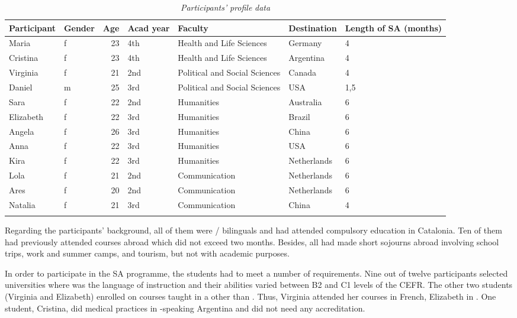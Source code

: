 \documentclass[output=paper]{langsci/langscibook}
\begin{document}
\begin{table}
\small
\begin{tabularx}{\textwidth}{l@{~}l@{~}rp{7mm}Ql@{~}Y}
\lsptoprule
\bfseries Participant & \bfseries Gender & \bfseries Age & \bfseries Acad year & \bfseries Faculty & \bfseries Destination & \bfseries Length of SA (months)\\
\midrule
Maria & f & 23 & 4th & Health and Life Sciences & Germany & 4\\
Cristina & f & 23 & 4th & Health and Life Sciences & Argentina & 4\\
Virginia & f & 21 & 2nd & Political and Social Sciences & Canada & 4\\
Daniel & m & 25 & 3rd & Political and Social Sciences & USA & 1,5\\
Sara & f & 22 & 2nd & Humanities & Australia & 6\\
Elizabeth & f & 22 & 3rd & Humanities & Brazil & 6\\
Angela & f & 26 & 3rd & Humanities & China & 6\\
Anna & f & 22 & 3rd & Humanities & USA & 6\\
Kira & f & 22 & 3rd & Humanities & Netherlands & 6\\
Lola & f & 21 & 2nd & Communication & Netherlands & 6\\
Ares & f & 20 & 2nd & Communication & Netherlands & 6\\
Natalia & f & 21 & 3rd & Communication & China & 4\\
\lspbottomrule
\end{tabularx} 
\caption{\textit{Participants’} \textit{profile} \textit{data}}
\label{tab:pogorelova:1}
\end{table}

Regarding the participants’  background, all of them were /\linebreak{} bilinguals and had attended compulsory education in Catalonia. Ten of them had previously attended  courses abroad which did not exceed two months. Besides, all had made short sojourns abroad involving school trips, work and summer camps, and tourism, but not with academic purposes. 

In order to participate in the SA programme, the students had to meet a number of  requirements. Nine out of twelve participants selected universities where  was the language of instruction and their  abilities varied between B2 and C1 levels of the CEFR. The other two students (Virginia and Elizabeth) enrolled on courses taught in a  other than . Thus, Virginia attended her courses in French, Elizabeth in . One student, Cristina, did medical practices in -speaking Argentina and did not need any  accreditation.  
\end{document}
